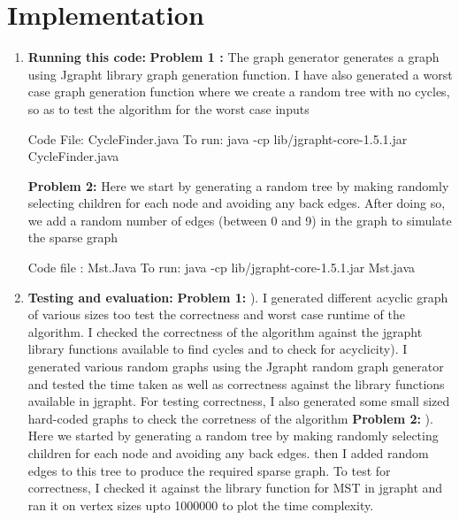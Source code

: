 \documentclass[12pt,letterpaper]{article}
\begin{document}
\newpage
\section*{Implementation}
\begin{enumerate}
\item\textbf{Running this code: }\newline\newline
\textbf{Problem 1 :} \newline
The graph generator generates a graph using Jgrapht library graph generation function. I have also generated a worst case graph generation function where we create a random tree with no cycles, so as to test the algorithm for the worst case inputs\newline

Code File: CycleFinder.java \newline\newline
To run: java -cp lib/jgrapht-core-1.5.1.jar CycleFinder.java\newline\newline

\textbf{Problem 2:} 
Here we start by generating a random tree by making randomly selecting children for each node and avoiding any back edges. After doing so, we add a random number of edges (between 0 and 9) in the graph to simulate the sparse graph\newline

Code file : Mst.Java \newline\newline
To run: java -cp lib/jgrapht-core-1.5.1.jar Mst.java\newline\newline

\item\textbf{Testing and evaluation: }\newline\newline
\textbf{Problem 1:} \newline{}). I generated different acyclic graph of various sizes too test the correctness and worst case runtime of the algorithm. I checked the correctness of the algorithm against the jgrapht library functions available to find cycles and to check for acyclicity\newline{}). I generated various random graphs using the Jgrapht random graph generator and tested the time taken as well as correctness against the library functions available in jgrapht. For testing correctness, I also generated some small sized hard-coded graphs to check the corretness of the algorithm\newpage
\textbf{Problem 2:} \newline{}). Here we started by generating a random tree by making randomly selecting children for each node and avoiding any back edges. then I added random edges to this tree to produce the required sparse graph. To test for correctness, I checked it against the library function for MST in jgrapht and ran it on vertex sizes upto 1000000 to plot the time complexity. 
\newline\newline
\end{enumerate}
\end{document}
